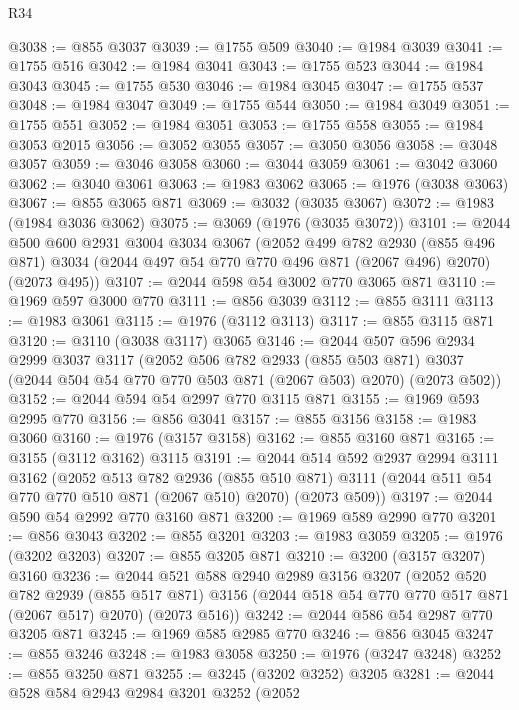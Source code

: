 \begin{lexlean}{R34}
\begin{coremodule}
@3038 := @855 @3037
@3039 := @1755 @509
@3040 := @1984 @3039
@3041 := @1755 @516
@3042 := @1984 @3041
@3043 := @1755 @523
@3044 := @1984 @3043
@3045 := @1755 @530
@3046 := @1984 @3045
@3047 := @1755 @537
@3048 := @1984 @3047
@3049 := @1755 @544
@3050 := @1984 @3049
@3051 := @1755 @551
@3052 := @1984 @3051
@3053 := @1755 @558
@3055 := @1984 @3053 @2015
@3056 := @3052 @3055
@3057 := @3050 @3056
@3058 := @3048 @3057
@3059 := @3046 @3058
@3060 := @3044 @3059
@3061 := @3042 @3060
@3062 := @3040 @3061
@3063 := @1983 @3062
@3065 := @1976 (@3038 @3063)
@3067 := @855 @3065 @871
@3069 := @3032 (@3035 @3067)
@3072 := @1983 (@1984 @3036 @3062)
@3075 := @3069 (@1976 (@3035 @3072))
@3101 := @2044
    @500
    @600
    @2931
    @3004
    @3034
    @3067
    (@2052
      @499
      @782
      @2930
      (@855 @496 @871)
      @3034
      (@2044 @497 @54 @770 @770 @496 @871 (@2067 @496) @2070)
      (@2073 @495))
@3107 := @2044 @598 @54 @3002 @770 @3065 @871
@3110 := @1969 @597 @3000 @770
@3111 := @856 @3039
@3112 := @855 @3111
@3113 := @1983 @3061
@3115 := @1976 (@3112 @3113)
@3117 := @855 @3115 @871
@3120 := @3110 (@3038 @3117) @3065
@3146 := @2044
    @507
    @596
    @2934
    @2999
    @3037
    @3117
    (@2052
      @506
      @782
      @2933
      (@855 @503 @871)
      @3037
      (@2044 @504 @54 @770 @770 @503 @871 (@2067 @503) @2070)
      (@2073 @502))
@3152 := @2044 @594 @54 @2997 @770 @3115 @871
@3155 := @1969 @593 @2995 @770
@3156 := @856 @3041
@3157 := @855 @3156
@3158 := @1983 @3060
@3160 := @1976 (@3157 @3158)
@3162 := @855 @3160 @871
@3165 := @3155 (@3112 @3162) @3115
@3191 := @2044
    @514
    @592
    @2937
    @2994
    @3111
    @3162
    (@2052
      @513
      @782
      @2936
      (@855 @510 @871)
      @3111
      (@2044 @511 @54 @770 @770 @510 @871 (@2067 @510) @2070)
      (@2073 @509))
@3197 := @2044 @590 @54 @2992 @770 @3160 @871
@3200 := @1969 @589 @2990 @770
@3201 := @856 @3043
@3202 := @855 @3201
@3203 := @1983 @3059
@3205 := @1976 (@3202 @3203)
@3207 := @855 @3205 @871
@3210 := @3200 (@3157 @3207) @3160
@3236 := @2044
    @521
    @588
    @2940
    @2989
    @3156
    @3207
    (@2052
      @520
      @782
      @2939
      (@855 @517 @871)
      @3156
      (@2044 @518 @54 @770 @770 @517 @871 (@2067 @517) @2070)
      (@2073 @516))
@3242 := @2044 @586 @54 @2987 @770 @3205 @871
@3245 := @1969 @585 @2985 @770
@3246 := @856 @3045
@3247 := @855 @3246
@3248 := @1983 @3058
@3250 := @1976 (@3247 @3248)
@3252 := @855 @3250 @871
@3255 := @3245 (@3202 @3252) @3205
@3281 := @2044
    @528
    @584
    @2943
    @2984
    @3201
    @3252
    (@2052

\end{coremodule}
\end{lexlean}
